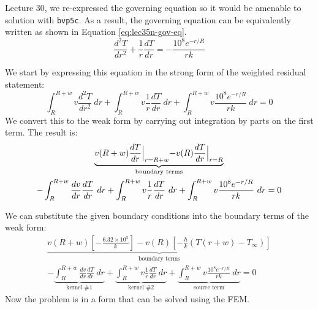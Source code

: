  Lecture 30, we re-expressed the governing equation so it would be amenable to solution with \lstinline[style=myMatlab]{bvp5c}.  As a result, the governing equation can be equivalently written as shown in Equation \ref{eq:lec35n-gov-eq}.
\begin{equation}
\frac{d^2T}{dr^2}+\frac{1}{r}\frac{dT}{dr} = -\frac{10^8e^{-r/R}}{rk}
\label{eq:lec35n-gov-eq}
\end{equation}

We start by expressing this equation in the strong form of the weighted residual statement:
\begin{equation*}
\int_{R}^{R+w} v \frac{d^2T}{dr^2} \ dr + \int_{R}^{R+w} v \frac{1}{r}\frac{dT}{dr} \ dr + \int_{R}^{R+w} v \frac{10^8e^{-r/R}}{rk} \ dr = 0
\end{equation*}
We convert this to the weak form by carrying out integration by parts on the first term.  The result is:
\begin{multline*}
\underbrace{v(R+w) \frac{dT}{dr}\Bigl|_{r=R+w} - v(R)\frac{dT}{dr}\Bigl|_{r=R}}_{\text{boundary terms}} \\
-\int_{R}^{R+w} \frac{dv}{dr}\frac{dT}{dr} \ dr +  \int_{R}^{R+w} v \frac{1}{r}\frac{dT}{dr} \ dr + \int_{R}^{R+w} v \frac{10^8e^{-r/R}}{rk} \ dr = 0
\end{multline*}

\noindent We can substitute the given boundary conditions into the boundary terms of the weak form:
\begin{multline*}
\underbrace{v(R+w) \left[-\frac{6.32\times 10^5}{k} \right] - v(R)\left[-\frac{h}{k}\left(T(r+w)-T_{\infty}\right) \right]}_{\text{boundary terms}} \\
-\underbrace{\int_{R}^{R+w} \frac{dv}{dr}\frac{dT}{dr} \ dr}_{\text{kernel \#1}} +\underbrace{\int_{R}^{R+w} v \frac{1}{r}\frac{dT}{dr} \ dr}_{\text{kernel \#2}} +\underbrace{\int_{R}^{R+w} v \frac{10^8e^{-r/R}}{rk} \ dr}_{\text{source term}} = 0
\end{multline*}
Now the problem is in a form that can be solved using the FEM.

